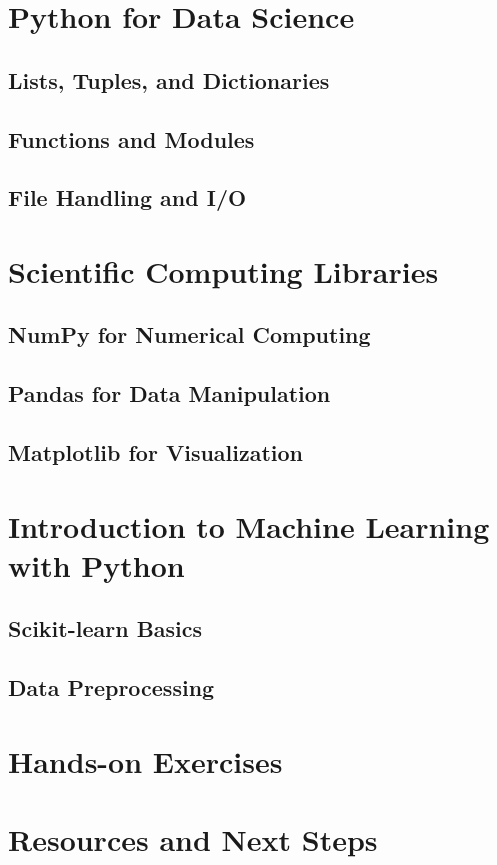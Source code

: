\documentclass[11pt]{beamer}
\begin{document}
\section{Python for Data Science}
\subsection{Lists, Tuples, and Dictionaries}



\subsection{Functions and Modules}



\subsection{File Handling and I/O}



\section{Scientific Computing Libraries}
\subsection{NumPy for Numerical Computing}


\subsection{Pandas for Data Manipulation}

\subsection{Matplotlib for Visualization}


\section{Introduction to Machine Learning with Python}
\subsection{Scikit-learn Basics}


\subsection{Data Preprocessing}

\section{Hands-on Exercises}

\section{Resources and Next Steps}
\end{document}
